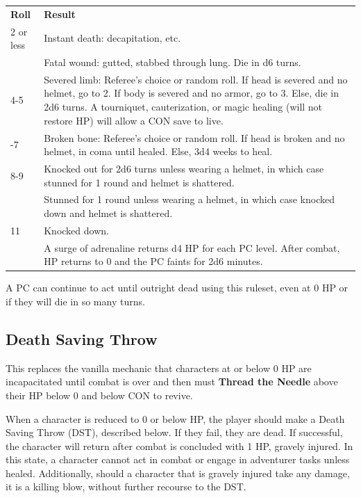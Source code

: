 \documentclass[twoside]{article}
\newcommand{\TTN}[2]{\textbf{Thread the Needle} above #1 and below #2}
\begin{document}
\begin{center}
\noindent\begin{tabular}{>{\centering\arraybackslash}p{}p{}}
\textbf{Roll}&\textbf{Result}\\
\rowcolor[gray]{0.75}2 or less&Instant death: decapitation, etc.\\
3&Fatal wound: gutted, stabbed through lung. Die in d6 turns.\\
\rowcolor[gray]{0.75}4-5&Severed limb: Referee's choice or random roll. If head is severed and no helmet, go to 2. If body is severed and no armor, go to 3. Else, die in 2d6 turns. A tourniquet, cauterization, or magic healing (will not restore HP) will allow a CON save to live.\\
6-7&Broken bone: Referee's choice or random roll. If head is broken and no helmet, in coma until healed. Else, 3d4 weeks to heal.\\
\rowcolor[gray]{0.75}8-9&Knocked out for 2d6 turns unless wearing a helmet, in which case stunned for 1 round and helmet is shattered.\\
10&Stunned for 1 round unless wearing a helmet, in which case knocked down and helmet is shattered.\\
\rowcolor[gray]{0.75}11&Knocked down.\\
12&A surge of adrenaline returns d4 HP for each PC level. After combat, HP returns to 0 and the PC faints for 2d6 minutes.\\
\end{tabular}
\end{center}

\bigbreak

A PC can continue to act until outright dead using this ruleset, even at 0 HP or if they will die in so many turns.

\subsection*{Death Saving Throw}

This replaces the vanilla mechanic that characters at or below 0 HP are incapacitated until combat is over and then must \TTN{their HP below 0}{CON} to revive.

\bigbreak

When a character is reduced to 0 or below HP, the player should make a Death Saving Throw (DST), described below. If they fail, they are dead. If successful, the character will return after combat is concluded with 1 HP, gravely injured. In this state, a character cannot act in combat or engage in adventurer tasks unless healed. Additionally, should a character that is gravely injured take any damage, it is a killing blow, without further recourse to the DST.
\end{document}
